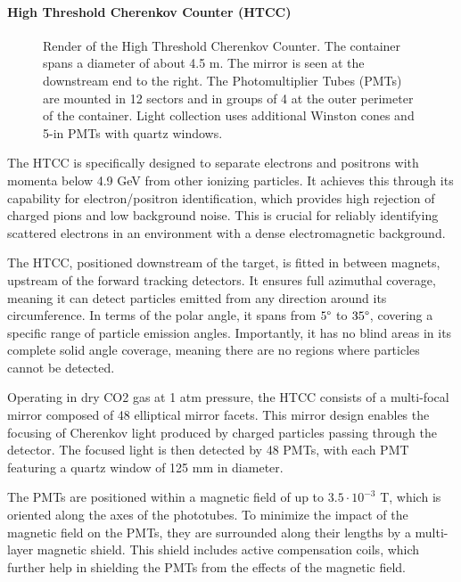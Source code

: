 \paragraph{High Threshold Cherenkov Counter (HTCC)}
    \begin{wrapfigure}{l}{0.50\textwidth}
        \caption[HTCC]
        {Render of the High Threshold Cherenkov Counter.
        The container spans a diameter of about 4.5 m. The mirror is seen at the downstream end to the right.
        The Photomultiplier Tubes (PMTs) are mounted in 12 sectors and in groups of 4 at the outer perimeter of the container.
        Light collection uses additional Winston cones and 5-in PMTs with quartz windows.}
        \label{fig::11.211::htcc}
    \end{wrapfigure}

    The HTCC is specifically designed to separate electrons and positrons with momenta below 4.9 GeV from other ionizing particles.
    It achieves this through its capability for electron/positron identification, which provides high rejection of charged pions and low background noise.
    This is crucial for reliably identifying scattered electrons in an environment with a dense electromagnetic background.

    The HTCC, positioned downstream of the target, is fitted in between magnets, upstream of the forward tracking detectors.
    It ensures full azimuthal coverage, meaning it can detect particles emitted from any direction around its circumference.
    In terms of the polar angle, it spans from $5\degree$ to $35\degree$, covering a specific range of particle emission angles.
    Importantly, it has no blind areas in its complete solid angle coverage, meaning there are no regions where particles cannot be detected.

    Operating in dry CO2 gas at 1 atm pressure, the HTCC consists of a multi-focal mirror composed of 48 elliptical mirror facets.
    This mirror design enables the focusing of Cherenkov light produced by charged particles passing through the detector.
    The focused light is then detected by 48 PMTs, with each PMT featuring a quartz window of 125 mm in diameter.

    The PMTs are positioned within a magnetic field of up to $3.5\cdot 10^{-3}$ T, which is oriented along the axes of the phototubes.
    To minimize the impact of the magnetic field on the PMTs, they are surrounded along their lengths by a multi-layer magnetic shield.
    This shield includes active compensation coils, which further help in shielding the PMTs from the effects of the magnetic field.

